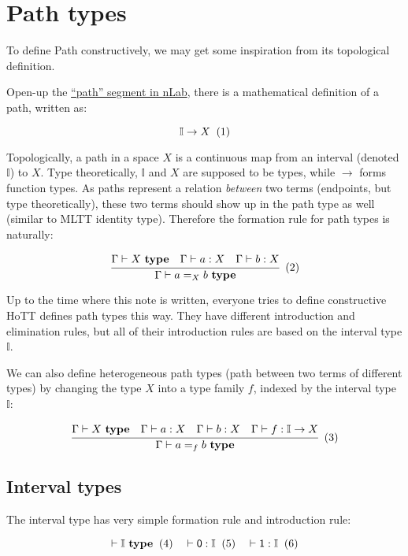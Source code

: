 \documentclass{article}
\newcommand\xtag{
\refstepcounter{equation}%
\;\;\text{(\theequation)}}
\begin{document}
\section{Path types}
\label{sec:path}

To define Path constructively,
we may get some inspiration from its topological definition.

Open-up the \href{https://ncatlab.org/nlab/show/path}{``path'' segment in nLab},
there is a mathematical definition of a path, written as:

\[
  \mathbb I \rightarrow X
  \xtag
\]

Topologically, a path in a space $X$ is a continuous map
from an interval (denoted $\mathbb I$) to $X$.
Type theoretically, $\mathbb I$ and $X$ are supposed to be types,
while $\rightarrow$ forms function types.
As paths represent a relation \textit{between} two terms
(endpoints, but type theoretically),
these two terms should show up in the path type as well
(similar to MLTT identity type).
Therefore the formation rule for path types is naturally:

\[
  \cfrac{
    \Gamma \vdash X \ \textbf{type}
    \quad
    \Gamma \vdash a : X
    \quad
    \Gamma \vdash b : X
  }{\Gamma \vdash a =_X b \ \textbf{type}}
  \xtag
\]

Up to the time where this note is written,
everyone tries to define constructive HoTT defines path types this way.
They have different introduction and elimination rules,
but all of their introduction rules are
based on the interval type $\mathbb I$.

We can also define heterogeneous path types
(path between two terms of different types)
by changing the type $X$ into a type family $f$,
indexed by the interval type $\mathbb I$:

\[
  \cfrac{
    \Gamma \vdash X \ \textbf{type}
    \quad
    \Gamma \vdash a : X
    \quad
    \Gamma \vdash b : X
    \quad
    \Gamma \vdash f : \mathbb I \rightarrow X
  }{\Gamma \vdash a =_f b \ \textbf{type}}
  \xtag
\]

\subsection{Interval types}

The interval type has very simple formation rule
and introduction rule:

\[
  \vdash \mathbb I\ \textbf{type}
  \xtag \quad
  \vdash \textsf 0 : \mathbb I
  \xtag \quad
  \vdash \textsf 1 : \mathbb I
  \xtag
\]
\end{document}
